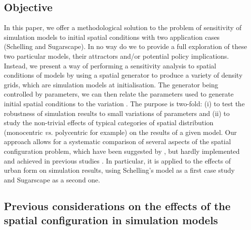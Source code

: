 \documentclass[preprint,5p,times,twocolumn,authoryear]{elsarticle}
\begin{document}
\subsection{Objective}

In this paper, we offer a methodological solution to the problem of sensitivity of simulation models to initial spatial conditions with two application cases (Schelling and Sugarscape). In no way do we  to provide a full exploration of these two particular models, their attractors and/or potential policy implications. Instead, we present a way of performing a sensitivity analysis to  spatial conditions of models by using a spatial generator to produce a variety of density grids, which are  simulation models at initialisation. The generator being controlled by  parameters, we can then relate the parameters used to generate initial spatial conditions to the variation . The purpose is two-fold: (i) to test the robustness of simulation results to small variations of  parameters and (ii) to study the non-trivial effects of typical categories of spatial distribution (monocentric \textit{vs.} polycentric for example) on the results of a given model. Our approach allows for a systematic comparison of several aspects of the spatial configuration problem, which have been suggested by \citet{filatova2013spatial}, but hardly implemented and achieved in previous studies . In particular, it is applied to the effects of urban form on simulation results, using Schelling's model as a first case study and Sugarscape as a second one. 

\subsection{Previous considerations on the effects of the spatial configuration in simulation models}
\end{document}
